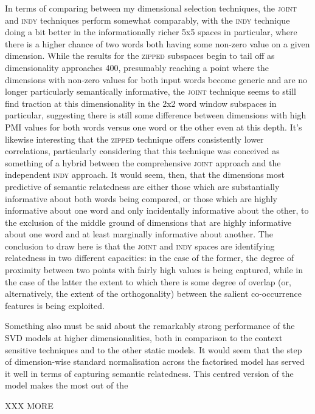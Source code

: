 In terms of comparing between my dimensional selection techniques, the \textsc{joint} and \textsc{indy} techniques perform somewhat comparably, with the \textsc{indy} technique doing a bit better in the informationally richer 5x5 spaces in particular, where there is a higher chance of two words both having some non-zero value on a given dimension.  While the results for the \textsc{zipped} subspaces begin to tail off as dimensionality approaches 400, presumably reaching a point where the dimensions with non-zero values for both input words become generic and are no longer particularly semantically informative, the \textsc{joint} technique seems to still find traction at this dimensionality in the 2x2 word window subspaces in particular, suggesting there is still some difference between dimensions with high PMI values for both words versus one word or the other even at this depth.  It's likewise interesting that the \textsc{zipped} technique offers consistently lower correlations, particularly considering that this technique was conceived as something of a hybrid between the comprehensive \textsc{joint} approach and the independent \textsc{indy} approach.  It would seem, then, that the dimensions most predictive of semantic relatedness are either those which are substantially informative about both words being compared, or those which are highly informative about one word and only incidentally informative about the other, to the exclusion of the middle ground of dimensions that are highly informative about one word and at least marginally informative about another.  The conclusion to draw here is that the \textsc{joint} and \textsc{indy} spaces are identifying relatedness in two different capacities: in the case of the former, the degree of proximity between two points with fairly high values is being captured, while in the case of the latter the extent to which there is some degree of overlap (or, alternatively, the extent of the orthogonality) between the salient co-occurrence features is being exploited.

Something also must be said about the remarkably strong performance of the \textsc{SVD} models at higher dimensionalities, both in comparison to the context sensitive techniques and to the other static models.  It would seem that the step of dimension-wise standard normalisation across the factorised model has served it well in terms of capturing semantic relatedness.  This centred version of the model makes the most out of the 

XXX MORE

